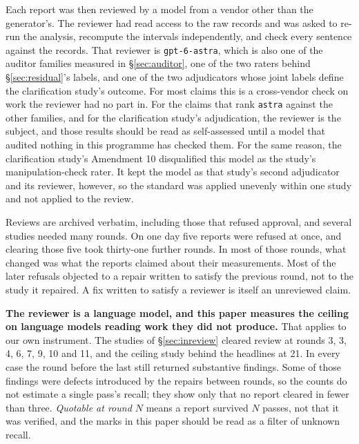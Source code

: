 Each report was then reviewed by a model from a vendor other than the generator's. The reviewer had
read access to the raw records and was asked to re-run the analysis, recompute the intervals
independently, and check every sentence against the records. That reviewer is \texttt{gpt-6-astra},
which is also one of the auditor families measured in \S\ref{sec:auditor}, one of the two raters
behind \S\ref{sec:residual}'s labels, and one of the two adjudicators whose joint labels define
the clarification study's outcome. For most claims this is a cross-vendor check on work the
reviewer had no part in. For the claims that rank \texttt{astra} against the other families, and
for the clarification study's adjudication, the reviewer is the subject, and those results should
be read as self-assessed until a model that audited nothing in this programme has checked them.
For the same reason, the clarification study's Amendment 10 disqualified this model as the study's
manipulation-check rater. It kept the model as that study's second adjudicator and its reviewer,
however, so the standard was applied unevenly within one study and not applied to the review.

Reviews are archived verbatim, including those that refused approval, and several studies needed
many rounds. On one day five reports were refused at once, and clearing those five took
thirty-one further rounds. In most of those rounds, what changed was what the reports claimed
about their measurements. Most of the later refusals objected to a repair written to satisfy the
previous round, not to the study it repaired. A fix written to satisfy a reviewer is itself an
unreviewed claim.

\textbf{The reviewer is a language model, and this paper measures the ceiling on language models
reading work they did not produce.} That applies to our own instrument. The studies of
\S\ref{sec:inreview} cleared review at rounds 3, 3, 4, 6, 7, 9, 10 and 11, and the
ceiling study behind the headlines at 21. In every case the round before the last still returned
substantive findings. Some of those findings were defects introduced by the repairs between
rounds, so the counts do not estimate a single pass's recall; they show only that no report
cleared in fewer than three. \emph{Quotable at round $N$} means a report survived $N$ passes, not
that it was verified, and the marks in this paper should be read as a filter of unknown recall.

